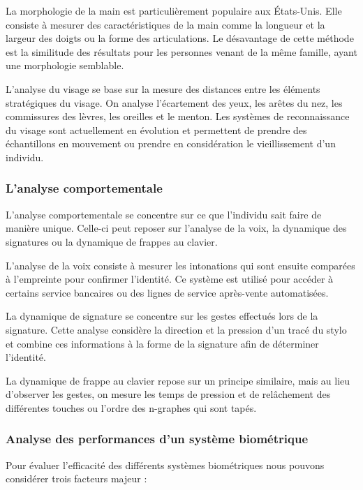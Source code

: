 La morphologie de la main est particulièrement populaire aux États-Unis. Elle consiste à mesurer des caractéristiques de la main comme la longueur et la largeur des doigts ou la forme des articulations. Le désavantage de cette méthode est la similitude des résultats pour les personnes venant de la même famille, ayant une morphologie semblable.

L'analyse du visage se base sur la mesure des distances entre les éléments stratégiques du visage. On analyse l'écartement des yeux,  les arêtes du nez, les commissures des lèvres, les oreilles et le menton. Les systèmes de reconnaissance du visage sont actuellement en évolution et permettent de prendre des échantillons en mouvement ou prendre en considération le vieillissement d'un individu.

\subsubsection{L'analyse comportementale}

L'analyse comportementale se concentre sur ce que l'individu sait faire de manière unique. Celle-ci peut reposer sur l'analyse de la voix, la dynamique des signatures ou la dynamique de frappes au clavier.

L'analyse de la voix consiste à mesurer les intonations qui sont ensuite comparées à l'empreinte pour confirmer l'identité. Ce système est utilisé pour accéder à certains service bancaires ou des lignes de service après-vente automatisées.

La dynamique de signature se concentre sur les gestes effectués lors de la signature. Cette analyse considère la direction et la pression d'un tracé du stylo et combine ces informations à la forme de la signature afin de déterminer l'identité.

La dynamique de frappe au clavier repose sur un principe similaire, mais au lieu d'observer les gestes, on mesure les temps de pression et de relâchement des différentes touches\cite{giotGREYC} ou l'ordre des n-graphes qui sont tapés\cite{bergadano2002,gunetti2005}.

\subsubsection{Analyse des performances d'un système biométrique}

Pour évaluer l'efficacité des différents systèmes biométriques nous pouvons considérer trois facteurs majeur\cite{elabedThese} :

